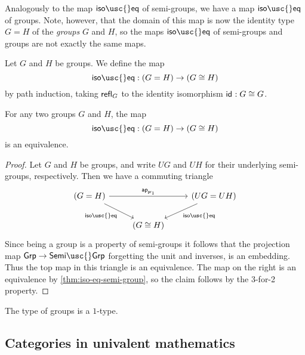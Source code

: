 Analogously to the map $\mathsf{iso\usc{}eq}$ of semi-groups, we have a map $\mathsf{iso\usc{}eq}$ of groups. Note, however, that the domain of this map is now the identity type $G=H$ of the \emph{groups} $G$ and $H$, so the maps $\mathsf{iso\usc{}eq}$ of semi-groups and groups are not exactly the same maps.

\begin{defn}
  Let $G$ and $H$ be groups. We define the map
  \begin{equation*}
    \mathsf{iso\usc{}eq} : (G=H)\to (G\cong H)
  \end{equation*}
  by path induction, taking $\mathsf{refl}_{G}$ to the identity isomorphism $\mathsf{id}_{}:G\cong G$.
\end{defn}

\begin{thm}
  For any two groups $G$ and $H$, the map
  \begin{equation*}
    \mathsf{iso\usc{}eq}:(G=H)\to (G\cong H)
  \end{equation*}
  is an equivalence.
\end{thm}

\begin{proof}
  Let $G$ and $H$ be groups, and write $UG$ and $UH$ for their underlying semi-groups, respectively. Then we have a commuting triangle
  \begin{equation*}
    \begin{tikzcd}
      (G=H) \arrow[rr,"\apfunc{\proj 1}"] \arrow[dr,swap,"\mathsf{iso\usc{}eq}"] & & (UG=UH) \arrow[dl,"\mathsf{iso\usc{}eq}"] \\
      & (G\cong H)
    \end{tikzcd}
  \end{equation*}
  Since being a group is a property of semi-groups it follows that the projection map $\mathsf{Grp}\to\mathsf{Semi\usc{}Grp}$ forgetting the unit and inverses, is an embedding. Thus the top map in this triangle is an equivalence. The map on the right is an equivalence by \cref{thm:iso-eq-semi-group}, so the claim follows by the 3-for-2 property.
\end{proof}

\begin{cor}
  The type of groups is a $1$-type.
\end{cor}

\subsection{Categories in univalent mathematics}

